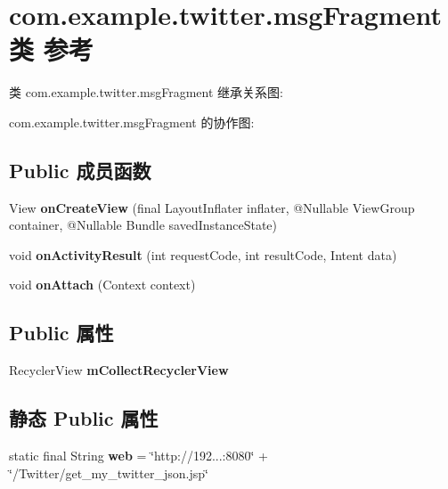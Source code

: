 \hypertarget{classcom_1_1example_1_1twitter_1_1msg_fragment}{}\section{com.\+example.\+twitter.\+msg\+Fragment类 参考}
\label{classcom_1_1example_1_1twitter_1_1msg_fragment}


类 com.\+example.\+twitter.\+msg\+Fragment 继承关系图\+:


com.\+example.\+twitter.\+msg\+Fragment 的协作图\+:
\subsection*{Public 成员函数}
\begin{DoxyCompactItemize}
\item 
\mbox{\label{classcom_1_1example_1_1twitter_1_1msg_fragment_a58388ef74e3c3ba214d06b13b90f4000}} 
View {\bfseries on\+Create\+View} (final Layout\+Inflater inflater, @Nullable View\+Group container, @Nullable Bundle saved\+Instance\+State)
\item 
\mbox{\label{classcom_1_1example_1_1twitter_1_1msg_fragment_ab8b152a251f25da7eccd892671bf9432}} 
void {\bfseries on\+Activity\+Result} (int request\+Code, int result\+Code, Intent data)
\item 
\mbox{\label{classcom_1_1example_1_1twitter_1_1msg_fragment_a830ca1a2afb6a0f406f4b4dbde52ca9f}} 
void {\bfseries on\+Attach} (Context context)
\end{DoxyCompactItemize}
\subsection*{Public 属性}
\begin{DoxyCompactItemize}
\item 
\mbox{\label{classcom_1_1example_1_1twitter_1_1msg_fragment_af7c611ff109bc4a30d7e7d1b308e4345}} 
Recycler\+View {\bfseries m\+Collect\+Recycler\+View}
\end{DoxyCompactItemize}
\subsection*{静态 Public 属性}
\begin{DoxyCompactItemize}
\item 
\mbox{\label{classcom_1_1example_1_1twitter_1_1msg_fragment_a9dabaa55df7b35d2d79c6b6a39f8e783}} 
static final String {\bfseries web} = \char`\"{}http\+://192...\+:8080\char`\"{} + \char`\"{}/Twitter/get\+\_\+my\+\_\+twitter\+\_\+json.\+jsp\char`\"{}
\end{DoxyCompactItemize}


